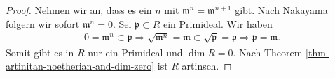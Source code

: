 \documentclass[reqno,12pt]{article}
\numberwithin{equation}{section}
\theoremstyle{plain}
\theoremstyle{definition}
\begin{document}
\begin{proof}
Nehmen wir an, dass es ein $n$ mit $\mathfrak{m}^n = \mathfrak{m}^{n+1}$ gibt. Nach Nakayama folgern wir sofort $\mathfrak{m}^n = 0$. Sei
$\mathfrak{p} \subset R$ ein Primideal. Wir haben
\begin{align*}
0=\mathfrak{m}^n  \subset \mathfrak{p} \Rightarrow \sqrt{\mathfrak{m}^n} = \mathfrak{m} \subset \sqrt{\mathfrak{p}} = \mathfrak{p} \Rightarrow \mathfrak{p} = \mathfrak{m}.
\end{align*}
Somit gibt es in $R$ nur ein Primideal und $\dim R = 0$. Nach Theorem \ref{thm-artinitan-noetherian-and-dim-zero} ist $R$ artinsch.
\end{proof}


\newpage


\end{document}

